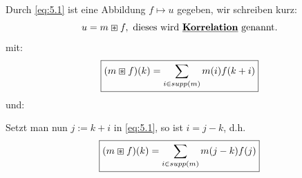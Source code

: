 \documentclass{article}
\theoremstyle{plain}
\theoremstyle{definition}
\numberwithin{equation}{section}
\newcommand{\mim}[1] {
\underline{\textbf{#1\index{#1}}}
}
\begin{document}
        Durch \eqref{eq:5.1} ist eine Abbildung $f \mapsto u$ gegeben, wir schreiben kurz:
        \[u = m \boxast f, \ \text{dieses wird \mim{Korrelation} genannt.}\]
        mit:
        \begin{equation}\label{eq:5.3}
            \framebox{$\displaystyle (m \boxast f)(k) = \sum_{i \in supp(m)} m(i) f(k+i)$}
        \end{equation}
        und:
        \begin{center}
        \end{center}

        Setzt man nun $j:= k + i$ in \eqref{eq:5.1}, so ist $i=j-k$, d.h.
        \begin{equation}\label{eq:5.4}
            \framebox{$\displaystyle (m \boxast f)(k) = \sum_{i \in supp(m)} m(j-k) f(j)$}
        \end{equation}
\end{document}
